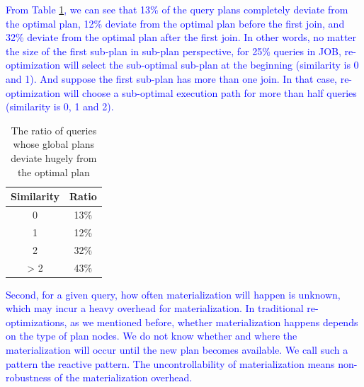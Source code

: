 \textcolor{blue}{
    From Table \ref{T1}, we can see that 13\% of the query plans completely deviate from the optimal plan, 12\% deviate from the optimal plan before the first join, and 32\% deviate from the optimal plan after the first join. In other words, no matter the size of the first sub-plan in sub-plan perspective, for 25\% queries in JOB, re-optimization will select the sub-optimal sub-plan at the beginning (similarity is 0 and 1). And suppose the first sub-plan has more than one join. In that case, re-optimization will choose a sub-optimal execution path for more than half queries (similarity is 0, 1 and 2).
}
    \begin{table}[htb]
        \caption{The ratio of queries whose global plans deviate hugely from the optimal plan}
        \label{T1}
        \begin{tabular}{c|c}
            \toprule
            Similarity & Ratio    \\
            \midrule
            0          & 13\%     \\
            1          & 12\%     \\
            2          & 32\%     \\
            > 2        & 43\%     \\
            \bottomrule
        \end{tabular}
    \end{table}\par
\textcolor{blue}{
    Second, for a given query, how often materialization will happen is unknown, which may incur a heavy overhead for materialization. In traditional re-optimizations, as we mentioned before, whether materialization happens depends on the type of plan nodes. We do not know whether and where the materialization will occur until the new plan becomes available. We call such a pattern the reactive pattern. The uncontrollability of materialization means non-robustness of the materialization overhead.
}\par
    
